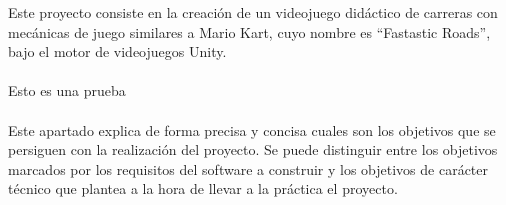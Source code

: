 Este proyecto consiste en la creación de un videojuego didáctico de carreras con mecánicas de juego similares a Mario Kart, cuyo nombre es “Fastastic Roads”, bajo el motor de videojuegos Unity. 
\\\\
Esto es una prueba
\\\\
Este apartado explica de forma precisa y concisa cuales son los objetivos que se persiguen con la realización del proyecto. Se puede distinguir entre los objetivos marcados por los requisitos del software a construir y los objetivos de carácter técnico que plantea a la hora de llevar a la práctica el proyecto.
